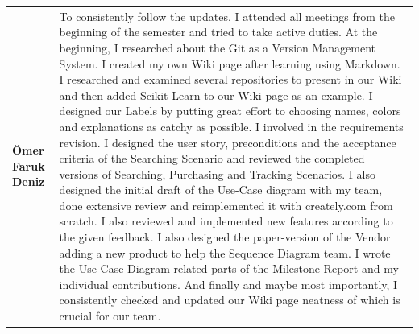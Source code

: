 \documentclass[]{article}
\begin{document}
\begin{table}[H]
{\begin{tabulary}{1.3\textwidth}{LL}
            \textbf{Ömer Faruk Deniz}    & To consistently follow the updates, I attended all meetings from the beginning of the semester and tried to take active duties. At the beginning, I researched about the Git as a Version Management System. I created my own Wiki page after learning using Markdown. I researched and examined several repositories to present in our Wiki and then added Scikit-Learn to our Wiki page as an example. I designed our Labels by putting great effort to choosing names, colors and explanations as catchy as possible. I involved in the requirements revision. I designed the user story, preconditions and the acceptance criteria of the Searching Scenario and reviewed the completed versions of Searching, Purchasing and Tracking Scenarios. I also designed the initial draft of the Use-Case diagram with my team, done extensive review and reimplemented it with creately.com from scratch. I also reviewed and implemented new features according to the given feedback. I also designed the paper-version of the Vendor adding a new product to help the Sequence Diagram team. I wrote the Use-Case Diagram related parts of the Milestone Report and my individual contributions. And finally and maybe most importantly, I consistently checked and updated our Wiki page neatness of which is crucial for our team.                                                                                                                                                                                                                                                                                 \\
        \end{tabulary}
    }
\end{table}

\begin{table}[H]
    \small
\end{table}
\end{document}
